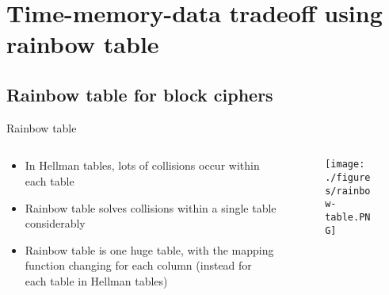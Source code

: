 \documentclass{beamer}
\begin{document}
\section{Time-memory-data tradeoff using rainbow table}

\subsection{Rainbow table for block ciphers}
\begin{frame}{Rainbow table}

\begin{columns}
\begin{column}{5cm}
\footnotesize{
\begin{itemize}
	\item In Hellman tables, lots of collisions occur within each table
	\item Rainbow table solves collisions within a single table considerably
	\item Rainbow table is one huge table, with the mapping function changing for each column (instead for each table in Hellman tables)
	
\end{itemize}}
\end{column}

\begin{column}{5cm}
	\begin{figure}[htp]
	\centering
	\texttt{[image: ./figures/rainbow-table.PNG]}
	\end{figure}

\end{column}
\end{columns}

\end{frame}
\end{document}
